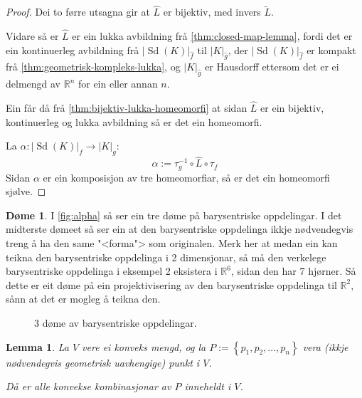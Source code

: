 \documentclass[a4paper, 12pt, norsk]{article}
\theoremstyle{plain}
\newtheorem{lemma}[theorem]{Lemma}
\theoremstyle{definition}
\newtheorem{example}[theorem]{Døme}
\newcommand{\Rb}{\mathbb{R}}
\newcommand{\gr}[1]{ \lvert #1 \rvert } %
\newcommand{\set}[1]{ \left\{ #1 \right\} } %
\DeclareMathOperator{\Sd}{Sd} %
\begin{document}
\begin{proof}
	Dei to førre utsagna gir at \( \hat{L} \) er bijektiv, med invers \( \tilde{L} \).

	Vidare så er \( \hat{L} \) er ein lukka avbildning frå \autoref{thm:closed-map-lemma}, fordi det er ein kontinuerleg avbildning frå \( \gr{\Sd(K)}_{\hat{f}} \) til \( \gr{K}_{\hat{g}} \), der \( \gr{\Sd(K)}_{\hat{f}} \) er kompakt frå \autoref{thm:geometrisk-kompleks-lukka}, og  \( \gr{K}_{\hat{g}} \) er Hausdorff ettersom det er ei delmengd av \( \Rb^n \) for ein eller annan \( n \).

	Ein får då frå \autoref{thm:bijektiv-lukka-homeomorfi} at sidan \( \hat{L} \) er ein bijektiv, kontinuerleg og lukka avbildning så er det ein homeomorfi.

	La \( \alpha: \gr{\Sd(K)}_f \to \gr{K}_g \):
	\[
		\alpha := \tau_g^{-1} \circ \hat{L} \circ \tau_f
	\]
	Sidan \( \alpha \) er ein komposisjon av tre homeomorfiar, så er det ein homeomorfi sjølve.
\end{proof}

\begin{example}
	I \autoref{fig:alpha} så ser ein tre døme på barysentriske oppdelingar. I det midterste dømeet så ser ein at den barysentriske oppdelinga ikkje nødvendegvis treng å ha den same "<forma"> som originalen. Merk her at medan ein kan teikna den barysentriske oppdelinga i 2 dimensjonar, så må den verkelege barysentriske oppdelinga i eksempel 2 eksistera i \( \Rb^{6} \), sidan den har 7 hjørner. Så dette er eit døme på ein projektivisering av den barysentriske oppdelinga til \( \Rb^2 \), sånn at det er mogleg å teikna den.
	\begin{figure}[htbp]
		\begin{center}
			
		\end{center}
		\caption{3 døme av barysentriske oppdelingar.}
		\label{fig:alpha}
	\end{figure}
\end{example}

\begin{lemma} \label{thm:konveks-kombinasjon-i-konveks} %
	La \( V \) vere ei konveks mengd, og la \( P := \set{p_1, p_2, \dots, p_n } \) vera (ikkje nødvendegvis geometrisk uavhengige) punkt i \( V \).
	
	Då er alle konvekse kombinasjonar av \( P \) inneheldt i \( V \).
\end{lemma}
\end{document}
